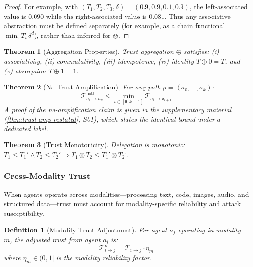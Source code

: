\documentclass[
]{article}
\newtheorem{definition}{Definition}[section]
\newtheorem{theorem}{Theorem}[section]
\begin{document}
\begin{proof}
For example, with $(T_1,T_2,T_3,\delta)=(0.9,0.9,0.1,0.9)$, the left-associated
value is $0.090$ while the right-associated value is $0.081$. Thus any
associative abstraction must be defined separately (for example, as a chain
functional $\min_i T_i\,\delta^d$), rather than inferred for $\otimes$.
\end{proof}

\begin{theorem}[Aggregation Properties]
\label{thm:aggregation}
Trust aggregation $\oplus$ satisfies: (i) associativity, (ii) commutativity, (iii) idempotence, (iv) identity $T \oplus 0 = T$, and (v) absorption $T \oplus 1 = 1$.
\end{theorem}

\begin{theorem}[No Trust Amplification]
\label{thm:no-trust-amp}
For any path $p = (a_0, \ldots, a_k)$:
\begin{equation}
\label{eq:no-amplification}
\mathcal{T}_{a_0 \to a_k}^{\text{path}} \leq \min_{i \in [0,k-1]} \mathcal{T}_{a_i \to a_{i+1}}
\end{equation}
A proof of the no-amplification claim is given in the supplementary material
(\cref{thm:trust-amp-restated}, S01), which states the identical bound under
a dedicated label.
\end{theorem}

\begin{theorem}[Trust Monotonicity]
\label{thm:trust-monotonic}
Delegation is monotonic: $T_1 \leq T_1' \land T_2 \leq T_2' \Rightarrow T_1 \otimes T_2 \leq T_1' \otimes T_2'$.
\end{theorem}

\subsubsection{Cross-Modality Trust}\label{sec:cross-modality-trust}

When agents operate across modalities---processing text, code, images,
audio, and structured data---trust must account for modality-specific
reliability and attack susceptibility.

\begin{definition}[Modality Trust Adjustment]
\label{def:modality-trust}
For agent $a_j$ operating in modality $m$, the adjusted trust from agent $a_i$ is:
\begin{equation}
\label{eq:modality-trust}
\mathcal{T}_{i \to j}^{m} = \mathcal{T}_{i \to j} \cdot \eta_m
\end{equation}
where $\eta_m \in (0, 1]$ is the modality reliability factor.
\end{definition}
\end{document}
